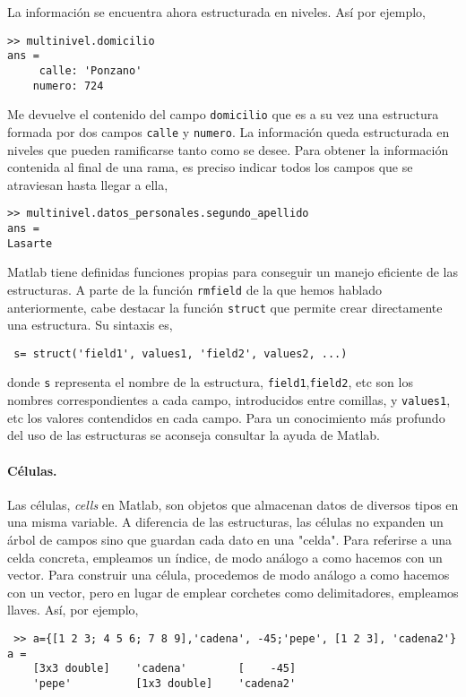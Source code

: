 La información se encuentra ahora estructurada en niveles. Así por ejemplo,

\begin{verbatim}
>> multinivel.domicilio
ans = 
     calle: 'Ponzano'
    numero: 724
\end{verbatim}

Me devuelve el contenido del campo \texttt{domicilio} que es a su vez una estructura formada por dos campos  \texttt{calle} y  \texttt{numero}. La información queda estructurada en niveles que pueden ramificarse tanto como se desee. Para obtener la información contenida al final de una rama, es preciso indicar todos los campos que se atraviesan hasta llegar a ella,

\begin{verbatim}
>> multinivel.datos_personales.segundo_apellido
ans =
Lasarte
\end{verbatim}

Matlab tiene definidas funciones propias para conseguir un manejo eficiente de las estructuras. A parte de la función \texttt{rmfield} de la que hemos hablado anteriormente, cabe destacar la función \texttt{struct} que permite crear directamente una estructura. Su sintaxis es,

\begin{verbatim}
 s= struct('field1', values1, 'field2', values2, ...)
\end{verbatim}

donde \texttt{s} representa el nombre de la estructura, \texttt{field1},\texttt{field2}, etc son los nombres correspondientes a cada campo, introducidos entre comillas, y \texttt{values1}, etc los valores contendidos en cada campo. Para un conocimiento más profundo del uso de las estructuras se aconseja consultar la ayuda de Matlab.

\paragraph*{Células.} Las células, \emph{cells} en Matlab, son objetos que almacenan datos de diversos tipos en una misma variable. A diferencia de las estructuras, las células no expanden un árbol de campos sino que guardan cada dato en una "celda".  Para referirse a una celda concreta, empleamos un índice, de modo análogo a como hacemos con un vector.  Para construir una célula, procedemos de modo análogo a como hacemos con un vector, pero en lugar de emplear corchetes como delimitadores, empleamos llaves. Así, por ejemplo,

 \begin{verbatim}
 >> a={[1 2 3; 4 5 6; 7 8 9],'cadena', -45;'pepe', [1 2 3], 'cadena2'}
a = 
    [3x3 double]    'cadena'        [    -45]
    'pepe'          [1x3 double]    'cadena2'
 \end{verbatim}

